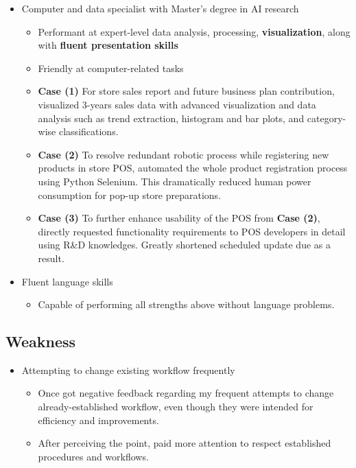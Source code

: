 \documentclass[a4paper,10pt]{extarticle}
\begin{document}
\begin{itemize}
	\item Computer and data specialist with Master's degree in AI research
	      \begin{itemize}
		      \item Performant at expert-level data analysis, processing, \textbf{visualization}, along with \textbf{fluent presentation skills}
		      \item Friendly at computer-related tasks
		      \item \textbf{Case (1)} For store sales report and future business plan contribution, visualized 3-years sales data with advanced visualization and data analysis such as trend extraction, histogram and bar plots, and category-wise classifications.
		      \item \textbf{Case (2)} To resolve redundant robotic process while registering new products in store POS, automated the whole product registration process using Python Selenium. This dramatically reduced human power consumption for pop-up store preparations.
		      \item \textbf{Case (3)} To further enhance usability of the POS from \textbf{Case (2)}, directly requested functionality requirements to POS developers in detail using R\&D knowledges. Greatly shortened scheduled update due as a result.
	      \end{itemize}
	\item Fluent language skills
	      \begin{itemize}
		      \item Capable of performing all strengths above without language problems.
	      \end{itemize}
\end{itemize}

\subsection*{Weakness}
\begin{itemize}
	\item Attempting to change existing workflow frequently
	      \begin{itemize}
		      \item Once got negative feedback regarding my frequent attempts to change already-established workflow, even though they were intended for efficiency and improvements.
		      \item After perceiving the point, paid more attention to respect established procedures and workflows.
	      \end{itemize}
\end{itemize}
\end{document}
